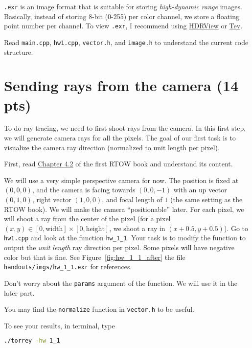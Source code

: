 \lstinline{.exr} is an image format that is suitable for storing \emph{high-dynamic range} images. Basically, instead of storing 8-bit (0-255) per color channel, we store a floating point number per channel. To view \lstinline{.exr}, I recommend using \href{https://github.com/wkjarosz/hdrview}{HDRView} or \href{https://github.com/Tom94/tev}{Tev}.

Read \lstinline{main.cpp}, \lstinline{hw1.cpp}, \lstinline{vector.h}, and \lstinline{image.h} to understand the current code structure.

\section{Sending rays from the camera (14 pts)}
To do ray tracing, we need to first shoot rays from the camera. In this first step, we will generate camera rays for all the pixels. The goal of our first task is to visualize the camera ray direction (normalized to unit length per pixel).

First, read \href{https://raytracing.github.io/books/RayTracingInOneWeekend.html\#rays,asimplecamera,andbackground}{Chapter 4.2} of the first RTOW book and understand its content.

We will use a very simple perspective camera for now. The position is fixed at $(0, 0, 0)$, and the camera is facing towards $(0, 0, -1)$ with an up vector $(0, 1, 0)$, right vector $(1, 0, 0)$, and focal length of $1$ (the same setting as the RTOW book). We will make the camera ``positionable'' later. For each pixel, we will shoot a ray from the center of the pixel (for a pixel $(x, y) \in [0, \text{width}] \times [0, \text{height}]$, we shoot a ray in $(x + 0.5, y + 0.5)$). Go to \lstinline{hw1.cpp} and look at the function \lstinline{hw_1_1}. Your task is to modify the function to output the \emph{unit length} ray direction per pixel. Some pixels will have negative color but that is fine. See Figure~\ref{fig:hw_1_1_after} the file \lstinline{handouts/imgs/hw_1_1.exr} for references.

Don't worry about the \lstinline{params} argument of the function. We will use it in the later part.

You may find the \lstinline{normalize} function in \lstinline{vector.h} to be useful.

To see your results, in terminal, type
\begin{lstlisting}[language=bash]
  ./torrey -hw 1_1
\end{lstlisting}

